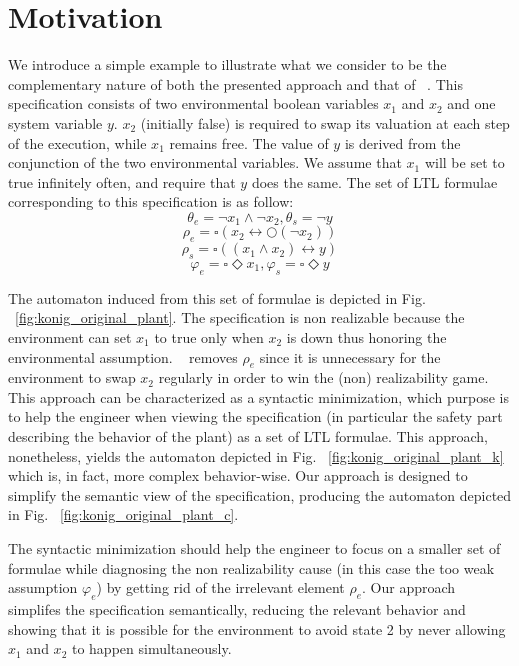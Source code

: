 \clearpage
\section{Motivation}\label{sec:motivation}

We introduce a simple example to illustrate what we consider to be the complementary nature 
of both the presented approach and that of ~\cite{DBLP:conf/hvc/KonighoferHB10}. This specification consists of two environmental boolean variables $x_1$ and $x_2$ and one system variable $y$. $x_2$ (initially false) is required to swap its valuation at each step of the execution, while $x_1$ remains free. The value of $y$ is derived from the conjunction of the two environmental variables.
We assume that $x_1$ will be set to true infinitely often, and require that $y$ does the same. The set of LTL formulae corresponding to this specification is as follow: 
	\[\theta_e = \neg x_1 \wedge \neg x_2, \theta_s = \neg y\]
	\[\rho_e = \square(x_2 \leftrightarrow \bigcirc(\neg x_2))\]
	\[\rho_s = \square((x_1 \wedge x_2) \leftrightarrow y)\]
	\[\varphi_e = \square \Diamond x_1, \varphi_s = \square \Diamond y\]	

The automaton induced from this set of formulae is depicted in Fig. ~\ref{fig:konig_original_plant}. The specification is non realizable because the environment can set $x_1$ to true only when $x_2$ is down thus honoring the environmental assumption. ~\cite{DBLP:conf/hvc/KonighoferHB10} removes $\rho_e$ since it is unnecessary for the environment to swap $x_2$ regularly in order to win the (non) realizability game. This approach can be characterized as a syntactic minimization, which purpose is to help the engineer when viewing the specification (in particular the safety part describing the behavior of the plant) as a set of LTL formulae. This approach, nonetheless, yields the automaton depicted in Fig. ~\ref{fig:konig_original_plant_k} which is, in fact, more complex behavior-wise. Our approach is designed to simplify the semantic view of the specification, producing the automaton depicted in Fig. ~\ref{fig:konig_original_plant_c}. 

The syntactic minimization should help the engineer to focus on a smaller set of formulae while diagnosing the non realizability cause (in this case the too weak assumption $\varphi_e$) by getting rid of the irrelevant element $\rho_e$. Our approach simplifes the specification semantically, reducing the relevant behavior and showing that it is possible for the environment to avoid state 2 by never allowing $x_1$ and $x_2$ to happen simultaneously. 

